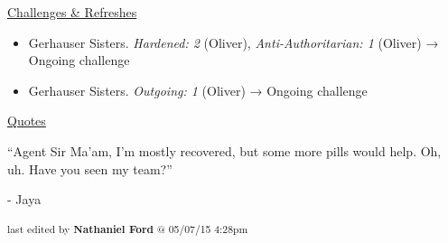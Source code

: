 \underline{  {\LARGE Challenges \& Refreshes }  }



\begin{itemize}
\item Gerhauser Sisters. \textit{Hardened: 2} (Oliver), \textit{Anti-Authoritarian: 1} (Oliver) → Ongoing challenge
\item Gerhauser Sisters. \textit{Outgoing: 1} (Oliver) → Ongoing challenge
\end{itemize}



\underline{  {\LARGE Quotes }  }



``Agent Sir Ma'am, I'm mostly recovered, but some more pills would help.  Oh, uh. Have you seen my team?''

- Jaya


\iffalse

======================
THESE ARE ERRORS ENCOUNTERED DURING THE EXPORT PROCESS
======================

	Unable to understand footnote +1, too many options & none that matched \footnote{$\rightarrow$\textbf{Adam Kenney }There was an awful lot of this. \textsubscript{11/04/12 5:46pm}}. Optional comment markups: \footnote{$\rightarrow$\textbf{Adam Kenney }+1 \textsubscript{11/04/12 4:31pm}}\footnote{$\rightarrow$\textbf{Suko T }+1 \textsubscript{11/04/12 8:05pm}}\footnote{$\rightarrow$\textbf{Adam Kenney }+1 \textsubscript{11/04/12 4:31pm}}\footnote{$\rightarrow$\textbf{Adam Kenney }+1 \textsubscript{10/24/12 9:12am}}\footnote{$\rightarrow$\textbf{Adam Kenney }+1 \textsubscript{10/24/12 9:06am}} 

	Unable to highlight for footnote: at least so far as I recall although my notes are a bit sketchy in this spot with all the dialog going on because:GivenExpectedHe doesn’t mention his opinion on HayleyHe doesn’t mention Hayley

	Unable to understand footnote +1, too many options & none that matched \footnote{$\rightarrow$\textbf{Suko T }Clearly the members of Morgan's teams are chosen for their mental stability and social graces. \textsubscript{10/23/12 3:50pm}}. Optional comment markups: \footnote{$\rightarrow$\textbf{Adam Kenney }+1 \textsubscript{11/04/12 4:31pm}}\footnote{$\rightarrow$\textbf{Suko T }+1 \textsubscript{11/04/12 8:05pm}}\footnote{$\rightarrow$\textbf{Adam Kenney }+1 \textsubscript{11/04/12 4:31pm}}\footnote{$\rightarrow$\textbf{Adam Kenney }+1 \textsubscript{10/24/12 9:12am}}\footnote{$\rightarrow$\textbf{Adam Kenney }+1 \textsubscript{10/24/12 9:06am}} 


\fi

\vspace{\fill}

\begin{flushright}
\textsubscript{last edited by \textbf{Nathaniel Ford} @ 05/07/15 4:28pm}
\end{flushright}

